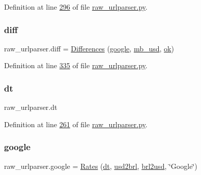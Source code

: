Definition at line \hyperlink{raw__urlparser_8py_source_l00296}{296} of file \hyperlink{raw__urlparser_8py_source}{raw\+\_\+urlparser.\+py}.

\mbox{\label{namespaceraw__urlparser_a86dc49fc55812ccc7eeda441b0fce83c}} 
\subsubsection{\texorpdfstring{diff}{diff}}
{\footnotesize\ttfamily raw\+\_\+urlparser.\+diff = \hyperlink{classraw__urlparser_1_1_differences}{Differences} (\hyperlink{namespaceraw__urlparser_a1b812abf4fbbd8478dca91446c66b646}{google}, \hyperlink{namespaceraw__urlparser_adb426668060d85f4fbd24135e258a8b3}{mb\+\_\+usd}, \hyperlink{namespaceraw__urlparser_aa0dcadbc04ec5d09f7a2dabb865000c8}{ok})}



Definition at line \hyperlink{raw__urlparser_8py_source_l00335}{335} of file \hyperlink{raw__urlparser_8py_source}{raw\+\_\+urlparser.\+py}.

\mbox{\label{namespaceraw__urlparser_acbaf2eef75f4aa43e1f6659c0fd34836}} 
\subsubsection{\texorpdfstring{dt}{dt}}
{\footnotesize\ttfamily raw\+\_\+urlparser.\+dt}



Definition at line \hyperlink{raw__urlparser_8py_source_l00261}{261} of file \hyperlink{raw__urlparser_8py_source}{raw\+\_\+urlparser.\+py}.

\mbox{\label{namespaceraw__urlparser_a1b812abf4fbbd8478dca91446c66b646}} 
\subsubsection{\texorpdfstring{google}{google}}
{\footnotesize\ttfamily raw\+\_\+urlparser.\+google = \hyperlink{classraw__urlparser_1_1_rates}{Rates} (\hyperlink{namespaceraw__urlparser_acbaf2eef75f4aa43e1f6659c0fd34836}{dt}, \hyperlink{namespaceraw__urlparser_adb724d2d0b7c561e8b0c53a42831efce}{usd2brl}, \hyperlink{namespaceraw__urlparser_ae7e1c02df9ab0102e017e31885aa6431}{brl2usd}, \char`\"{}Google\char`\"{})}



